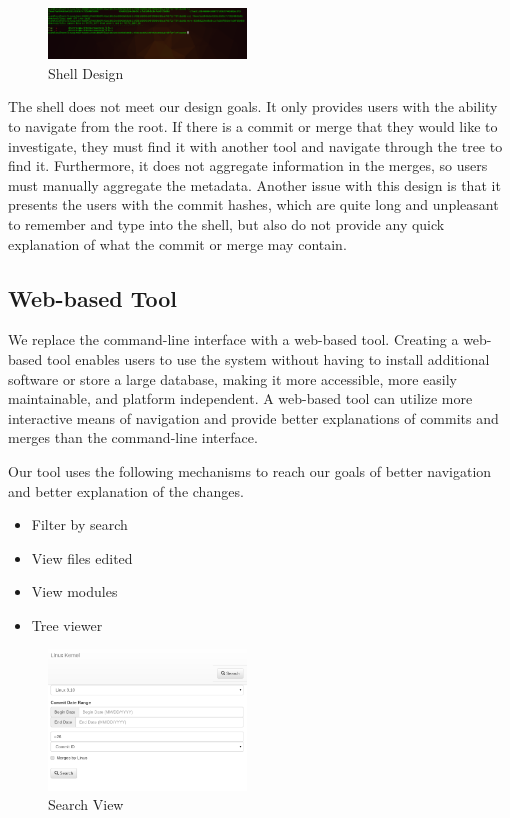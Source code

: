 \documentclass[conference, draftclsnofoot, draft]{IEEEtran}
\begin{document}
\begin{figure}
        \centering
        \includegraphics[width=0.47\textwidth]{figures/shell.png}
        \caption{Shell Design}
        \label{fig:shell}
\end{figure}

The shell does not meet our design goals. It only provides users with the ability to
navigate from the root. If there is a commit or merge that they would like to
investigate, they must find it with another tool and navigate through the tree to
find it. Furthermore, it does not aggregate information in the merges, so users must
manually aggregate the metadata. Another issue with this design is that it presents
the users with the commit hashes, which are quite long and unpleasant to remember
and type into the shell, but also do not provide any quick explanation of what the
commit or merge may contain.

\subsection{Web-based Tool}

We replace the command-line interface with a web-based tool. Creating a web-based
tool enables users to use the system without having to install additional software
or store a large database, making it more accessible, more easily maintainable, and
platform independent. A web-based tool can utilize more interactive means of
navigation and provide better explanations of commits and merges than the
command-line interface.

Our tool uses the following mechanisms to reach our goals of better navigation and
better explanation of the changes.

\begin{itemize}
        \item Filter by search
        \item View files edited
        \item View modules
        \item Tree viewer
\end{itemize}


\begin{figure}
        \centering
        \includegraphics[width=0.47\textwidth]{figures/search.png}
        \caption{Search View}
        \label{fig:search}
\end{figure}
\end{document}
